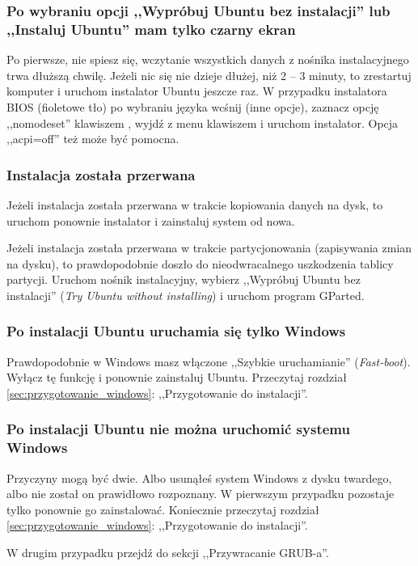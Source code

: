 \subsubsection{Po wybraniu opcji ,,Wypróbuj Ubuntu bez instalacji'' lub ,,Instaluj Ubuntu'' mam tylko czarny ekran}
Po pierwsze, nie spiesz się, wczytanie wszystkich danych z nośnika instalacyjnego trwa dłuższą chwilę. Jeżeli nic się nie dzieje dłużej, niż 2 -- 3 minuty, to zrestartuj komputer i uruchom instalator Ubuntu jeszcze raz. W przypadku instalatora BIOS (fioletowe tło) po wybraniu języka wcśnij  (inne opcje), zaznacz opcję ,,nomodeset'' klawiszem \keys{\returnwin}, wyjdź z menu klawiszem  i uruchom instalator. Opcja ,,acpi=off'' też może być pomocna.

\subsubsection{Instalacja została przerwana}
Jeżeli instalacja została przerwana w trakcie kopiowania danych na dysk, to uruchom ponownie instalator i zainstaluj system od nowa.

Jeżeli instalacja została przerwana w trakcie partycjonowania (zapisywania zmian na dysku), to prawdopodobnie doszło do nieodwracalnego uszkodzenia tablicy partycji. Uruchom nośnik instalacyjny, wybierz ,,Wypróbuj Ubuntu bez instalacji'' (\textit{Try Ubuntu without installing}) i uruchom program GParted.

\subsubsection{Po instalacji Ubuntu uruchamia się tylko Windows}
Prawdopodobnie w Windows masz włączone ,,Szybkie uruchamianie'' (\textit{Fast-boot}). Wyłącz tę funkcję i ponownie zainstaluj Ubuntu. Przeczytaj rozdział \ref{sec:przygotowanie_windows}: ,,Przygotowanie do instalacji''.

\subsubsection{Po instalacji Ubuntu nie można uruchomić systemu Windows}
Przyczyny mogą być dwie. Albo usunąłeś system Windows z dysku twardego, albo nie został on prawidłowo rozpoznany. W pierwszym przypadku pozostaje tylko ponownie go zainstalować. Koniecznie przeczytaj rozdział \ref{sec:przygotowanie_windows}: ,,Przygotowanie do instalacji''.

W drugim przypadku przejdź do sekcji ,,Przywracanie GRUB-a''.

